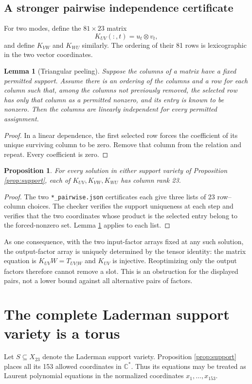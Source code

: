 \documentclass[11pt,letterpaper]{article}
\newtheorem{lemma}[theorem]{Lemma}
\newtheorem{proposition}[theorem]{Proposition}
\theoremstyle{definition}\newtheorem{definition}[theorem]{Definition}
\theoremstyle{remark}\newtheorem{remark}[theorem]{Remark}
\newcommand{\Cstar}{\mathbb C^{\!*}}
\newcommand{\file}[1]{\nolinkurl{#1}}
\begin{document}
\subsection{A stronger pairwise independence certificate}
For two modes, define the $81\times23$ matrix
\[
 K_{UV}(:,t)=u_t\otimes v_t,
\]
and define $K_{VW}$ and $K_{WU}$ similarly. The ordering of their 81 rows is
lexicographic in the two vector coordinates.

\begin{lemma}[Triangular peeling]\label{lem:peel}
Suppose the columns of a matrix have a fixed permitted support. Assume
there is an ordering of the columns and a row for each column such that,
among the columns not previously removed, the selected row has only that
column as a permitted nonzero, and its entry is known to be nonzero.
Then the columns are linearly independent for every permitted assignment.
\end{lemma}
\begin{proof}
In a linear dependence, the first selected row forces the coefficient of
its unique surviving column to be zero. Remove that column from the
relation and repeat. Every coefficient is zero.
\end{proof}

\begin{proposition}\label{prop:pairwise}
For every solution in either support variety of Proposition
\ref{prop:support}, each of $K_{UV},K_{VW},K_{WU}$ has column rank 23.
\end{proposition}
\begin{proof}
The two \file{*_pairwise.json} certificates each give three lists of
23 row--column choices. The checker verifies the support uniqueness at
each step and verifies that the two coordinates whose product is the
selected entry belong to the forced-nonzero set. Lemma \ref{lem:peel}
applies to each list.
\end{proof}

As one consequence, with the two input-factor arrays fixed at any such
solution, the output-factor array is uniquely determined by the tensor
identity: the matrix equation is $K_{UV}W=T_{UV|W}$ and $K_{UV}$ is
injective. Reoptimizing only the output factors therefore cannot remove a
slot. This is an obstruction for the displayed pairs, not a lower bound
against all alternative pairs of factors.

\section{The complete Laderman support variety is a torus}
\label{sec:torus}
Let $S\subseteq X_{23}$ denote the Laderman support variety. Proposition
\ref{prop:support} places all its 153 allowed coordinates in $\Cstar$.
Thus its equations may be treated as Laurent polynomial equations in the
normalized coordinates $x_1,\ldots,x_{153}$.
\end{document}
